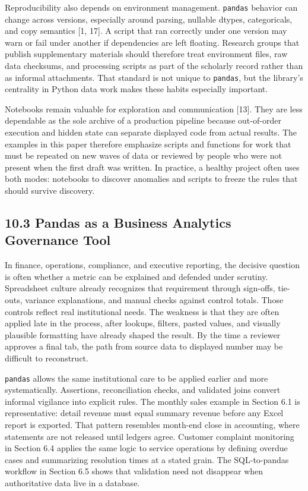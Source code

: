 \documentclass[
  12pt,
]{article}
\begin{document}
Reproducibility also depends on environment management. \texttt{pandas}
behavior can change across versions, especially around parsing, nullable
dtypes, categoricals, and copy semantics {[}1, 17{]}. A script that ran
correctly under one version may warn or fail under another if
dependencies are left floating. Research groups that publish
supplementary materials should therefore treat environment files, raw
data checksums, and processing scripts as part of the scholarly record
rather than as informal attachments. That standard is not unique to
\texttt{pandas}, but the library's centrality in Python data work makes
these habits especially important.

Notebooks remain valuable for exploration and communication {[}13{]}.
They are less dependable as the sole archive of a production pipeline
because out-of-order execution and hidden state can separate displayed
code from actual results. The examples in this paper therefore emphasize
scripts and functions for work that must be repeated on new waves of
data or reviewed by people who were not present when the first draft was
written. In practice, a healthy project often uses both modes: notebooks
to discover anomalies and scripts to freeze the rules that should
survive discovery.

\subsection{10.3 Pandas as a Business Analytics Governance
Tool}\label{pandas-as-a-business-analytics-governance-tool}

In finance, operations, compliance, and executive reporting, the
decisive question is often whether a metric can be explained and
defended under scrutiny. Spreadsheet culture already recognizes that
requirement through sign-offs, tie-outs, variance explanations, and
manual checks against control totals. Those controls reflect real
institutional needs. The weakness is that they are often applied late in
the process, after lookups, filters, pasted values, and visually
plausible formatting have already shaped the result. By the time a
reviewer approves a final tab, the path from source data to displayed
number may be difficult to reconstruct.

\texttt{pandas} allows the same institutional care to be applied earlier
and more systematically. Assertions, reconciliation checks, and
validated joins convert informal vigilance into explicit rules. The
monthly sales example in Section 6.1 is representative: detail revenue
must equal summary revenue before any Excel report is exported. That
pattern resembles month-end close in accounting, where statements are
not released until ledgers agree. Customer complaint monitoring in
Section 6.4 applies the same logic to service operations by defining
overdue cases and summarizing resolution times at a stated grain. The
SQL-to-pandas workflow in Section 6.5 shows that validation need not
disappear when authoritative data live in a database.
\end{document}
